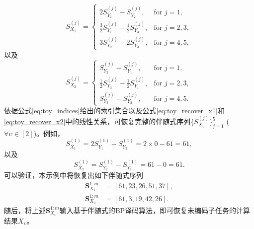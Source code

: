 \begin{equation}
	S_{X_1}^{(j)} =
	\begin{cases}
		2S_{Y_1}^{(j)} - S_{Y_2}^{(j)}, & \text{for } j = 1, \\
		\frac{3}{2} S_{Y_1}^{(j)} - \frac{1}{2} S_{Y_3}^{(j)}, & \text{for } j = 2, 3, \\
		3S_{Y_2}^{(j)} - 2S_{Y_3}^{(j)}, & \text{for } j = 4, 5,
	\end{cases}
	\label{eq:toy_recover_x1}
\end{equation}
以及
\begin{equation}
	S_{X_2}^{(j)} =
	\begin{cases}
		S_{Y_2}^{(j)} - S_{Y_1}^{(j)}, & \text{for } j = 1, \\
		\frac{1}{2} S_{Y_3}^{(j)} - \frac{1}{2} S_{Y_1}^{(j)}, & \text{for } j = 2, 3, \\
		S_{Y_3}^{(j)} - S_{Y_2}^{(j)}, & \text{for } j = 4, 5.
	\end{cases}
	\label{eq:toy_recover_x2}
\end{equation}
依据公式\eqref{eq:toy_indices}给出的索引集合以及公式\eqref{eq:toy_recover_x1}和\eqref{eq:toy_recover_x2}中的线性关系，可恢复完整的伴随式序列$\{S_{X_\upsilon}^{(j)}\}_{j=
	1}^5$ ($\forall\upsilon\in[2]$)。例如，
\begin{equation}
	S_{X_1}^{(1)} = 2S_{Y_1}^{(1)} - S_{Y_2}^{(1)} = 2 \times 0 - 61 = 61,
	\label{eq:toy_calc_example1}
\end{equation}
以及
\begin{equation}
	S_{X_2}^{(1)} = S_{Y_2}^{(1)} - S_{Y_1}^{(1)} = 61 - 0 = 61.
	\label{eq:toy_calc_example2}
\end{equation}
可以验证，本示例中将恢复出如下伴随式序列
\begin{align}
	\mathbf{S}_{X_1}^{1:m} &= [61, 23, 26, 51, 37], \label{eq:toy_res_x1} \\
	\mathbf{S}_{X_2}^{1:m} &= [61, 3, 19, 42, 26]. \label{eq:toy_res_x2}
\end{align}
随后，将上述$\mathbf{S}_{X_\upsilon}^{1:m}$输入基于伴随式的BP译码算法，即可恢复未编码子任务的计算结果$X_\upsilon$。

